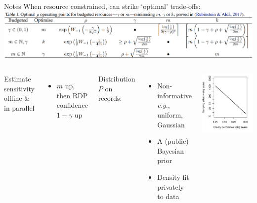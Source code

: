 \documentclass{beamer}
\newcommand{\eg}{\emph{e.g.},\xspace}
\begin{document}
\begin{frame}{Notes}
When resource constrained, can strike \alert{`optimal' trade-offs}: \\
\includegraphics[width=1.0\textwidth]{figures/oppts} \\[0.8em]
\begin{columns}[T,onlytextwidth]
Estimate \alert{sensitivity offline \& in parallel}
\begin{itemize}
\item $m$ up, then RDP confidence $1-\gamma$ up
\end{itemize}
\vspace{0.5em}
\alert{Distribution $P$} on records:
\begin{itemize}
	\item Non-informative \eg uniform, Gaussian
	\item A (public) Bayesian prior
	\item Density fit privately to data
\end{itemize}
\vspace{0.5em}
\includegraphics[width=1\columnwidth]{figures/m-vs-gamma}
\end{columns}
\end{frame}
\end{document}
